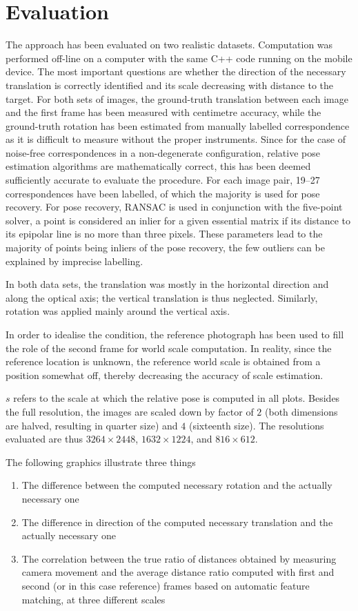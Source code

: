\chapter{Evaluation}
\label{ch:evaluation}

The approach has been evaluated on two realistic datasets. Computation was
performed off-line on a computer with the same C++ code running on the mobile device.
The most important questions are whether the direction of the necessary
translation is correctly identified and its scale decreasing with distance to
the target.  For both sets of images, the ground-truth translation between each
image and the first frame has been measured with centimetre accuracy, while the
ground-truth rotation has been estimated from manually labelled correspondence
as it is difficult to measure without the proper instruments. Since for the case
of noise-free correspondences in a non-degenerate configuration, relative pose
estimation algorithms are mathematically correct, this has been deemed
sufficiently accurate to evaluate the procedure. For each image pair, 19--27
correspondences have been labelled, of which the majority is used for pose
recovery. For pose recovery, RANSAC is used in conjunction with the five-point
solver, a point is considered an inlier for a given essential matrix if its
distance to its epipolar line is no more than three pixels. These parameters
lead to the majority of points being inliers of the pose recovery, the few
outliers can be explained by imprecise labelling.

In both data sets, the translation was mostly in the horizontal direction and
along the optical axis; the vertical translation is thus neglected. Similarly,
rotation was applied mainly around the vertical axis.

In order to idealise the condition, the reference photograph has been used to
fill the role of the second frame for world scale computation. In reality, since
the reference location is unknown, the reference world scale is obtained from a
position somewhat off, thereby decreasing the accuracy of scale estimation.

$s$ refers to the scale at which the relative pose is computed in all plots.
Besides the full resolution, the images are scaled down by factor of $2$ (both
dimensions are halved, resulting in quarter size) and $4$ (sixteenth size). The
resolutions evaluated are thus $3264\times2448$, $1632\times1224$, and
$816\times612$.

The following graphics illustrate three things
\begin{enumerate}
   \item The difference between the computed necessary rotation and the actually
      necessary one
   \item The difference in direction of the computed necessary translation and
      the actually necessary one
   \item The correlation between the true ratio of distances obtained by
      measuring camera movement and the average distance ratio computed with first
      and second (or in this case reference) frames based on automatic feature matching, at
      three different scales
\end{enumerate}

